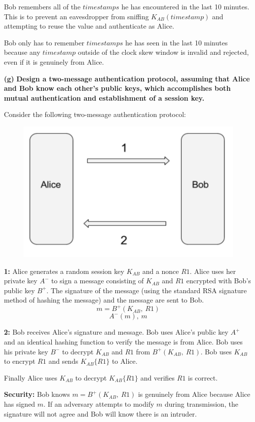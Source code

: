 \documentclass[11pt]{article}
\renewcommand\part[1]{\vspace{.10in}\textbf{(#1)}}
\begin{document}
Bob remembers all of the $timestamps$ he has encountered in the last 10 minutes. This is to prevent an eavesdropper from sniffing $K_{AB}(timestamp)$ and attempting to reuse the value and authenticate as Alice.

Bob only has to remember $timestamps$ he has seen in the last 10 minutes because any $timestamp$ outside of the clock skew window is invalid and rejected, even if it is genuinely from Alice.

\part{g} \textbf{Design a two-message authentication protocol, assuming that Alice and Bob know each other's public keys, which accomplishes both mutual authentication and establishment of a session key.}

Consider the following two-message authentication protocol:

\begin{figure}[H]
  \centerline{\includegraphics[width=0.5\linewidth]{protocol.png}}
\end{figure}

\textbf{1:} Alice generates a random session key $K_{AB}$ and a nonce $R1$. Alice uses her private key $A^-$ to sign a message consisting of $K_{AB}$ and $R1$ encrypted with Bob's public key $B^+$. The signature of the message (using the standard RSA signature method of hashing the message) and the message are sent to Bob.
$$m = B^+(K_{AB}, \ R1)$$
$$A^-(m), \ m$$

\textbf{2:} Bob receives Alice's signature and message. Bob uses Alice's public key $A^+$ and an identical hashing function to verify the message is from Alice. Bob uses his private key $B^-$ to decrypt $K_{AB}$ and $R1$ from $B^+(K_{AB}, \ R1)$. Bob uses $K_{AB}$ to encrypt $R1$ and sends $K_{AB}\{R1\}$ to Alice.

Finally Alice uses $K_{AB}$ to decrypt $K_{AB}\{R1\}$ and verifies $R1$ is correct.

\textbf{Security:} Bob knows $m = B^+(K_{AB}, \ R1)$ is genuinely from Alice because Alice has signed $m$. If an adversary attempts to modify $m$ during transmission, the signature will not agree and Bob will know there is an intruder.
\end{document}
